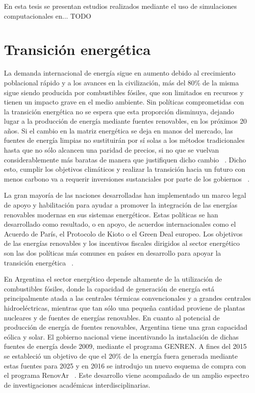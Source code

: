 En esta tesis se presentan estudios realizados mediante el uso de simulaciones 
computacionales en... TODO

\section{Transición energética}

La demanda internacional de energía sigue en aumento debido al crecimiento 
poblacional rápido y a los avances en la civilización, más del 80\% de la misma
sigue siendo producida por combustibles fósiles, que son limitados en recursos 
y tienen un impacto grave en el medio ambiente. Sin políticas comprometidas con 
la transición energética no se espera que esta proporción disminuya, dejando 
lugar a la producción de energía mediante fuentes renovables, en los próximos 20
años. Si el cambio en la matriz energética se deja en manos del mercado, las 
fuentes de energía limpias no sustituirán por sí solas a los métodos tradicionales
hasta que no sólo alcancen una paridad de precios, si no que se vuelvan 
considerablemente más baratas de manera que justifiquen dicho cambio
~\cite{davidson2019}. Dicho esto, cumplir los objetivos climáticos y realizar la 
transición hacia un futuro con menos carbono va a requerir inversiones 
sustanciales por parte de los gobiernos ~\cite{leonhardt2022}.

La gran mayoría de las naciones desarrolladas han implementado un marco legal de 
apoyo y habilitación para ayudar a promover la integración de las energías 
renovables modernas en sus sistemas energéticos. Estas políticas se han 
desarrollado como resultado, o en apoyo, de acuerdos internacionales como el 
Acuerdo de París, el Protocolo de Kioto o el Green Deal europeo. Los objetivos 
de las energías renovables y los incentivos fiscales dirigidos al sector 
energético son las dos políticas más comunes en países en desarrollo para apoyar 
la transición energética ~\cite{cantarero2020}.

En Argentina el sector energético depende altamente de la utilización de 
combustibles fósiles, donde la capacidad de generación de energía está 
principalmente atada a las centrales térmicas convencionales y a grandes 
centrales hidroeléctricas, mientras que tan sólo una pequeña cantidad proviene 
de plantas nucleares y de fuentes de energías renovables. En cuanto al potencial
de producción de energía de fuentes renovables, Argentina tiene una gran 
capacidad eólica y solar. El gobierno nacional viene incentivando la instalación 
de dichas fuentes de energía desde 2009, mediante el programa GENREN. A fines 
del 2015 se estableció un objetivo de que el 20\% de la energía fuera generada
mediante estas fuentes para 2025 y en 2016 se introdujo un nuevo esquema de 
compra con el programa RenovAr ~\cite{schaube2018}. Este desarrollo viene 
acompañado de un amplio espectro de investigaciones académicas 
interdisciplinarias.

